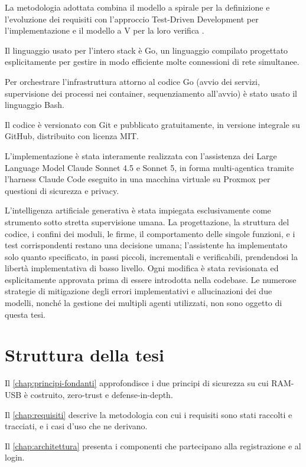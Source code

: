 La metodologia adottata combina il modello a spirale per la definizione e l'evoluzione dei 
requisiti \cite{Boehm88} con l'approccio Test-Driven Development per l'implementazione e il modello a V per 
la loro verifica \cite{ramusb-contributing}.

Il linguaggio usato per l'intero stack è Go, un linguaggio compilato progettato esplicitamente per gestire 
in modo efficiente molte connessioni di rete simultanee.

Per orchestrare l'infrastruttura attorno al codice Go (avvio dei servizi, supervisione dei processi nei 
container, sequenziamento all'avvio) è stato usato il linguaggio Bash. 

Il codice è versionato con Git e pubblicato gratuitamente, in versione integrale su GitHub, distribuito con 
licenza MIT. 

L'implementazione è stata interamente realizzata con l'assistenza dei Large Language Model Claude 
Sonnet 4.5 e Sonnet 5, in forma multi-agentica tramite l'harness Claude Code eseguito in una macchina 
virtuale su Proxmox per questioni di sicurezza e privacy.

L'intelligenza artificiale generativa è stata impiegata esclusivamente come strumento sotto stretta 
supervisione umana. 
La progettazione, la struttura del codice, i confini dei moduli, le firme, il comportamento delle singole 
funzioni, e i test corrispondenti restano una decisione umana; l'assistente ha implementato solo quanto 
specificato, in passi piccoli, incrementali e verificabili, prendendosi la libertà implementativa di basso 
livello.
Ogni modifica è stata revisionata ed esplicitamente approvata prima di essere introdotta nella codebase.
Le numerose strategie di mitigazione degli errori implementativi e allucinazioni dei due modelli, nonché la
gestione dei multipli agenti utilizzati, non sono oggetto di questa tesi.

\section{Struttura della tesi}

Il \autoref{chap:principi-fondanti} approfondisce i due principi di sicurezza su cui RAM-USB è costruito,
zero-trust e defense-in-depth.

Il \autoref{chap:requisiti} descrive la metodologia con cui i requisiti sono stati raccolti e tracciati,
e i casi d'uso che ne derivano.

Il \autoref{chap:architettura} presenta i componenti che partecipano alla registrazione e al login.

